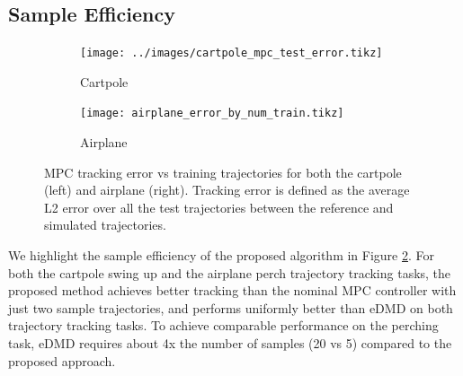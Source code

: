 \documentclass{article}
\begin{document}
\subsection{Sample Efficiency}
\begin{figure}[t]
  \centering
  \begin{subfigure}[t]{0.48\textwidth}
    \texttt{[image: ../images/cartpole\_mpc\_test\_error.tikz]}
    \caption{Cartpole}
    \label{fig:cartpole_mpc_test_error}
  \end{subfigure}
  \hfill
  \begin{subfigure}[t]{0.48\textwidth}
    \texttt{[image: airplane\_error\_by\_num\_train.tikz]}
    \caption{Airplane}
  \end{subfigure}
  \caption{MPC tracking error vs training trajectories for both the cartpole (left) and
  airplane (right). Tracking error is defined as the average L2 error over all the
  test trajectories between the reference and simulated trajectories.}
  \label{fig:sample_efficiency}
\end{figure}

We highlight the sample efficiency of the proposed algorithm in Figure 
\ref{fig:sample_efficiency}. For both the cartpole swing up and the airplane perch trajectory 
tracking tasks, the proposed method achieves better tracking than the nominal MPC controller
with just two sample trajectories, and performs uniformly better than eDMD on both 
trajectory tracking tasks. To achieve comparable performance on the perching task, eDMD 
requires about 4x the number of samples (20 vs 5) compared to the proposed approach.


\end{document}
